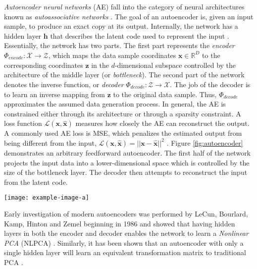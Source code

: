 \textit{Autoencoder neural networks} (AE) fall into the category of neural architectures known as \textit{autoassociative networks} \citep{Rojas1996AssociativeNetworks}.  The goal of an autoencoder is, given an input sample, to produce an exact copy at its output.  Internally, the network has a hidden layer $\bm{h}$ that describes the latent code used to represent the input \citep{Goodfellow2016DeepLearning}.  Essentially, the network has two parts.  The first part represents the \textit{encoder} $\Phi_{encode}:\mathcal{X} \rightarrow \mathcal{Z}$, which maps the data sample coordinates $\bm{x} \in \mathbb{R}^{D}$ to the corresponding coordinates $\bm{z}$ in the $d$-dimensional subspace controlled by the architecture of the middle layer (or \textit{bottleneck}).  The second part of the network denotes the inverse function, or \textit{decoder} $\Phi_{decode}:\mathcal{Z} \rightarrow \hat{\mathcal{X}}$.   The job of the decoder is to learn an inverse mapping from $\bm{z}$ to the original data sample.  Thus, $\Phi_{decode}$ approximates the assumed data generation process.  In general,  the AE is constrained either through its architecture or through a sparsity constraint.  A loss function $\mathcal{L}(\bm{x},\hat{\bm{x}})$  measures how closely the AE can reconstruct the output.  A commonly used AE loss is MSE, which penalizes the estimated output from being different from the input, $\mathcal{L}(\bm{x},\hat{\bm{x}}) = ||\bm{x} -  \hat{\bm{x}}||^{2}$ \citep{Ball2017DLRemoteSensing}.  Figure \ref{fig:autoencoder} demonstrates an arbitrary feedforward autoencoder.  The first half of the network projects the input data into a lower-dimensional space which is controlled by the size of the bottleneck layer.  The decoder then attempts to reconstruct the input from the latent code.
\begin{center}
	\begin{figure*}[h]
		\centering
		\texttt{[image: example-image-a]}
		\caption[Autoencoder neural network]{Autoencoder}
		\label{fig:autoencoder}
	\end{figure*}
\end{center}

Early investigation of modern autoencoders was performed by LeCun, Bourlard, Kamp, Hinton and Zemel beginning in 1986 \citep{Goodfellow2016DeepLearning, Bengio2014RepLearningReview} and showed that having hidden layers in both the encoder and decoder enables the network to learn a \textit{Nonlinear PCA} (NLPCA) \citep{Scholz2008NonlinearPCA}. Similarly, it has been shown that an autoencoder with only a single hidden layer will learn an equivalent transformation matrix to traditional PCA \citep{Bengio2014RepLearningReview}.

